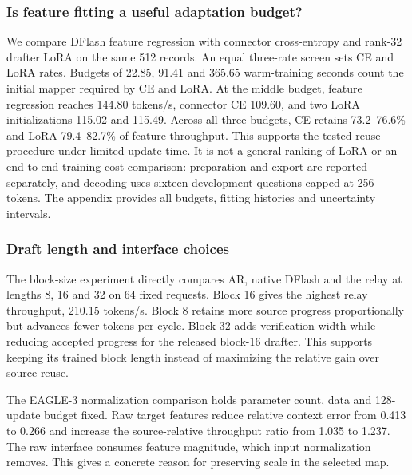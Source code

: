 \documentclass{article}
\begin{document}
\subsubsection{Is feature fitting a useful adaptation budget?}
We compare DFlash feature regression with connector cross-entropy and
rank-32 drafter LoRA on the same 512 records. An equal three-rate screen
sets CE and LoRA rates. Budgets of 22.85, 91.41 and 365.65 warm-training
seconds count the initial mapper required by CE and LoRA. At the middle
budget, feature regression reaches 144.80 tokens/s, connector CE 109.60,
and two LoRA initializations 115.02 and 115.49. Across all three budgets,
CE retains 73.2--76.6\% and LoRA 79.4--82.7\% of feature throughput.
This supports the tested reuse procedure under limited update time.
It is not a general ranking of LoRA or an end-to-end training-cost
comparison: preparation and export are reported separately, and decoding
uses sixteen development questions capped at 256 tokens. The appendix
provides all budgets, fitting histories and uncertainty intervals.

\subsubsection{Draft length and interface choices}

The block-size experiment directly compares AR, native DFlash and the
relay at lengths 8, 16 and 32 on 64 fixed requests. Block 16 gives the
highest relay throughput, 210.15 tokens/s. Block 8 retains more source
progress proportionally but advances fewer tokens per cycle. Block 32
adds verification width while reducing accepted progress for the
released block-16 drafter. This supports keeping its trained block length
instead of maximizing the relative gain over source reuse.

\begin{table}[H]
\caption{DFlash-8B block-size ablation on 64 questions, a 512-token cap
and RTX 6000 Ada hardware. AR is measured in each run.}
\label{tab:block}
\centering\small
\setlength{\tabcolsep}{4pt}

\end{table}

The EAGLE-3 normalization comparison holds parameter count, data and
128-update budget fixed. Raw target features reduce relative context
error from 0.413 to 0.266 and increase the source-relative throughput
ratio from 1.035 to 1.237. The raw interface consumes feature magnitude,
which input normalization removes. This gives a concrete reason for
preserving scale in the selected map.
\end{document}
